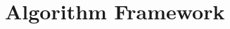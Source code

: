 \documentclass[conference]{IEEEtran}
\begin{document}
% 
% 
% 


\section{Algorithm Framework}\label{sec_framework}
\end{document}
